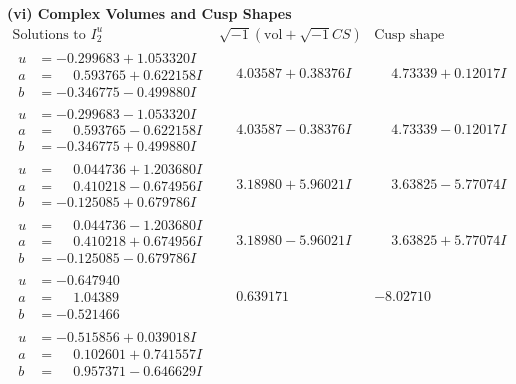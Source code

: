 \documentclass[1p]{elsarticle_modified}
\theoremstyle{definition}
\newcommand{\I}{\sqrt{-1}}
\begin{document}
\newpage\flushleft \textbf{(vi) Complex Volumes and Cusp Shapes}
$$\begin{array}{c|c|c}  
\text{Solutions to }I^u_{2}& \I (\text{vol} + \sqrt{-1}CS) & \text{Cusp shape}\\
 \hline 
\begin{aligned}
u &= -0.299683 + 1.053320 I \\
a &= \phantom{-}0.593765 + 0.622158 I \\
b &= -0.346775 - 0.499880 I\end{aligned}
 & \phantom{-}4.03587 + 0.38376 I & \phantom{-}4.73339 + 0.12017 I \\ \hline\begin{aligned}
u &= -0.299683 - 1.053320 I \\
a &= \phantom{-}0.593765 - 0.622158 I \\
b &= -0.346775 + 0.499880 I\end{aligned}
 & \phantom{-}4.03587 - 0.38376 I & \phantom{-}4.73339 - 0.12017 I \\ \hline\begin{aligned}
u &= \phantom{-}0.044736 + 1.203680 I \\
a &= \phantom{-}0.410218 - 0.674956 I \\
b &= -0.125085 + 0.679786 I\end{aligned}
 & \phantom{-}3.18980 + 5.96021 I & \phantom{-}3.63825 - 5.77074 I \\ \hline\begin{aligned}
u &= \phantom{-}0.044736 - 1.203680 I \\
a &= \phantom{-}0.410218 + 0.674956 I \\
b &= -0.125085 - 0.679786 I\end{aligned}
 & \phantom{-}3.18980 - 5.96021 I & \phantom{-}3.63825 + 5.77074 I \\ \hline\begin{aligned}
u &= -0.647940\phantom{ +0.000000I} \\
a &= \phantom{-}1.04389\phantom{ +0.000000I} \\
b &= -0.521466\phantom{ +0.000000I}\end{aligned}
 & \phantom{-}0.639171\phantom{ +0.000000I} & -8.02710\phantom{ +0.000000I} \\ \hline\begin{aligned}
u &= -0.515856 + 0.039018 I \\
a &= \phantom{-}0.102601 + 0.741557 I \\
b &= \phantom{-}0.957371 - 0.646629 I\end{aligned}

\end{array}$$
\end{document}

